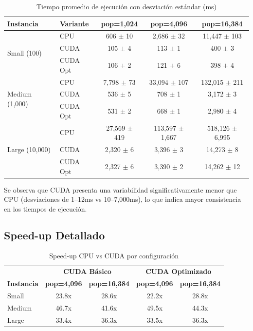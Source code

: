 \documentclass[12pt,a4paper]{article}
\begin{document}
\begin{table}[H]
\centering
\caption{Tiempo promedio de ejecuci\'on con desviaci\'on est\'andar (ms)}
\label{tab:tiempos}
\small
\begin{tabular}{llccc}
\toprule
\textbf{Instancia} & \textbf{Variante} & \textbf{pop=1,024} & \textbf{pop=4,096} & \textbf{pop=16,384} \\
\midrule
\multirow{3}{*}{Small (100)} & CPU & 606 $\pm$ 10 & 2,686 $\pm$ 32 & 11,447 $\pm$ 103 \\
 & CUDA & 105 $\pm$ 4 & 113 $\pm$ 1 & 400 $\pm$ 3 \\
 & CUDA Opt & 106 $\pm$ 2 & 121 $\pm$ 6 & 398 $\pm$ 4 \\
\midrule
\multirow{3}{*}{Medium (1,000)} & CPU & 7,798 $\pm$ 73 & 33,094 $\pm$ 107 & 132,015 $\pm$ 211 \\
 & CUDA & 536 $\pm$ 5 & 708 $\pm$ 1 & 3,172 $\pm$ 3 \\
 & CUDA Opt & 531 $\pm$ 2 & 668 $\pm$ 1 & 2,980 $\pm$ 4 \\
\midrule
\multirow{3}{*}{Large (10,000)} & CPU & 27,569 $\pm$ 419 & 113,597 $\pm$ 1,667 & 518,126 $\pm$ 6,995 \\
 & CUDA & 2,320 $\pm$ 6 & 3,396 $\pm$ 3 & 14,273 $\pm$ 8 \\
 & CUDA Opt & 2,327 $\pm$ 6 & 3,390 $\pm$ 2 & 14,262 $\pm$ 12 \\
\bottomrule
\end{tabular}
\end{table}

Se observa que CUDA presenta una variabilidad significativamente menor que CPU (desviaciones de 1--12ms vs 10--7,000ms), lo que indica mayor consistencia en los tiempos de ejecuci\'on.

\subsection{Speed-up Detallado}

\begin{table}[H]
\centering
\caption{Speed-up CPU vs CUDA por configuraci\'on}
\label{tab:speedup}
\small
\begin{tabular}{lcccc}
\toprule
 & \multicolumn{2}{c}{\textbf{CUDA B\'asico}} & \multicolumn{2}{c}{\textbf{CUDA Optimizado}} \\
\textbf{Instancia} & \textbf{pop=4,096} & \textbf{pop=16,384} & \textbf{pop=4,096} & \textbf{pop=16,384} \\
\midrule
Small & 23.8x & 28.6x & 22.2x & 28.8x \\
Medium & 46.7x & 41.6x & 49.5x & 44.3x \\
Large & 33.4x & 36.3x & 33.5x & 36.3x \\
\bottomrule
\end{tabular}
\end{table}
\end{document}
